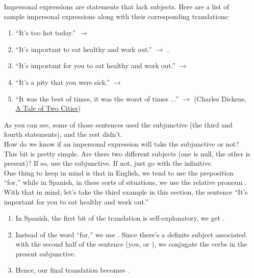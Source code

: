 Impersonal expressions are statements that lack subjects. Here are a list of sample impersonal expressions along with their corresponding translations:
\begin{enumerate}[noitemsep]
	\item ``It's too hot today.'' $\rightarrow$ 
	\item ``It's important to eat healthy and work out.'' $\rightarrow$ .
	\item ``It's important for you to eat healthy and work out.'' $\rightarrow$ 
	\item ``It's a pity that you were sick.'' $\rightarrow$ 
	\item ``It was the best of times, it was the worst of times ...'' $\rightarrow$  (Charles Dickens, \underline{A Tale of Two Cities})
\end{enumerate}

As you can see, some of those sentences used the subjunctive (the third and fourth statements), and the rest didn't. \\

How do we know if an impersonal expression will take the subjunctive or not? This bit is pretty simple. Are there two different subjects (one is null, the other is present)? If so, use the subjunctive. If not, just go with the infinitive. \\

One thing to keep in mind is that in English, we tend to use the preposition ``for,'' while in Spanish, in these sorts of situations, we use the relative pronoun . \\

With that in mind, let's take the third example in this section, the sentence ``It's important for you to eat healthy and work out.''
\begin{enumerate}
	\item In Spanish, the first bit of the translation is self-explanatory, we get .
	\item Instead of the word ``for,'' we use . Since there's a definite subject associated with the second half of the sentence (you, or ), we conjugate the verbs in the present subjunctive.
	\item Hence, our final translation becomes . 
\end{enumerate}

